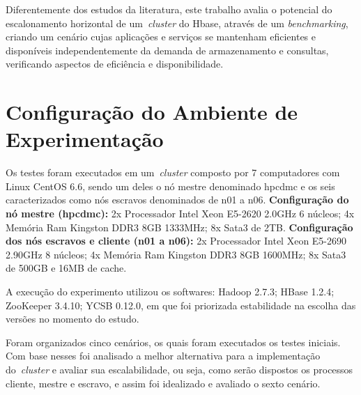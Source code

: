 \documentclass[12pt]{article}
\begin{document}
Diferentemente dos estudos da literatura, este trabalho avalia o potencial do escalonamento horizontal de um~\emph{cluster} do Hbase, através de um \textit{benchmarking}, criando um cenário cujas aplicações e serviços se mantenham eficientes e disponíveis independentemente da demanda de armazenamento e consultas, verificando aspectos de eficiência e disponibilidade.

\section{Configuração do Ambiente de Experimentação}
\label{sec:conf-experimento}

Os testes foram executados em um~\emph{cluster} composto por 7 computadores com Linux CentOS 6.6, sendo um deles o nó mestre denominado hpcdmc e os seis caracterizados como nós escravos denominados de n01 a n06. \textbf{Configuração do nó mestre (hpcdmc):} 2x Processador Intel Xeon E5-2620 2.0GHz 6 núcleos; 4x Memória Ram Kingston DDR3 8GB 1333MHz; 8x Sata3 de 2TB. \textbf{Configuração dos nós escravos e cliente (n01 a n06):} 2x Processador Intel Xeon E5-2690 2.90GHz 8 núcleos; 4x Memória Ram Kingston DDR3 8GB 1600MHz; 8x Sata3 de 500GB e 16MB de cache.

A execução do experimento utilizou os softwares: Hadoop 2.7.3; HBase 1.2.4; ZooKeeper 3.4.10; YCSB 0.12.0, em que foi priorizada estabilidade na escolha das versões no momento do estudo.

Foram organizados cinco cenários, os quais foram executados os testes iniciais. 
Com base nesses foi analisado a melhor alternativa para a implementação do~\emph{cluster} e avaliar sua escalabilidade, ou seja, como serão dispostos os processos cliente, mestre e escravo, e assim foi idealizado e avaliado o sexto cenário.
\end{document}

